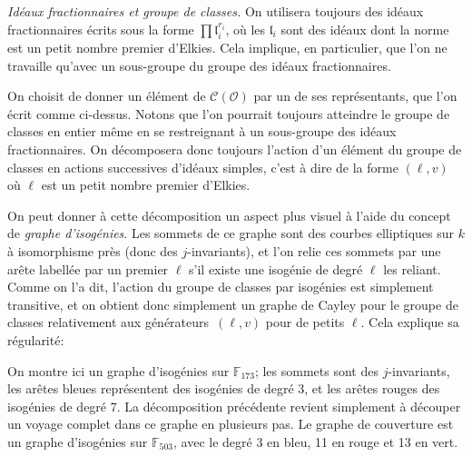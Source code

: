 \documentclass[11pt,a4paper]{article}
\newcommand{\F}{\mathbb{F}}
\renewcommand{\O}{\mathcal{O}}
\newcommand{\Cl}{\mathcal{C}}
\renewcommand{\frak}{\mathfrak}
\renewcommand{\v}{\vspace{5mm}}
\theoremstyle{definition}
\begin{document}
\emph{Idéaux fractionnaires et groupe de classes.} On utilisera toujours des idéaux fractionnaires écrits sous la forme $\prod {\frak l}_i^{r_i}$, où les ${\frak l}_i$ sont des idéaux dont la norme est un petit nombre premier d'Elkies. Cela implique, en particulier, que l'on ne travaille qu'avec un sous-groupe du groupe des idéaux fractionnaires.

On choisit de donner un élément de $\Cl(\O)$ par un de ses représentants, que l'on écrit comme ci-dessus. Notons que l'on pourrait toujours atteindre le groupe de classes en entier même en se restreignant à un sous-groupe des idéaux fractionnaires. On décomposera donc toujours l'action d'un élément du groupe de classes en actions successives d'idéaux \og simples\fg, c'est à dire de la forme $(\ell, v)$ où $\ell$ est un petit nombre premier d'Elkies.

On peut donner à cette décomposition un aspect plus visuel à l'aide du concept de \emph{graphe d'isogénies}. Les sommets de ce graphe sont des courbes elliptiques sur $k$ à isomorphisme près (donc des $j$-invariants), et l'on relie ces sommets par une arête labellée par un premier $\ell$ s'il existe une isogénie de degré $\ell$ les reliant. Comme on l'a dit, l'action du groupe de classes par isogénies est simplement transitive, et on obtient donc simplement un graphe de Cayley pour le groupe de classes relativement aux \og générateurs\fg\ $(\ell, v)$ pour de petits $\ell$. Cela explique sa régularité:

\begin{center}
\end{center}


On montre ici un graphe d'isogénies sur $\F_{173}$; les sommets sont des $j$-invariants, les arêtes bleues représentent des isogénies de degré 3, et les arêtes rouges des isogénies de degré 7. La décomposition précédente revient simplement à découper un voyage complet dans ce graphe en plusieurs pas. Le graphe de couverture est un graphe d'isogénies sur $\F_503$, avec le degré 3 en bleu, 11 en rouge et 13 en vert. 
\v
\end{document}
